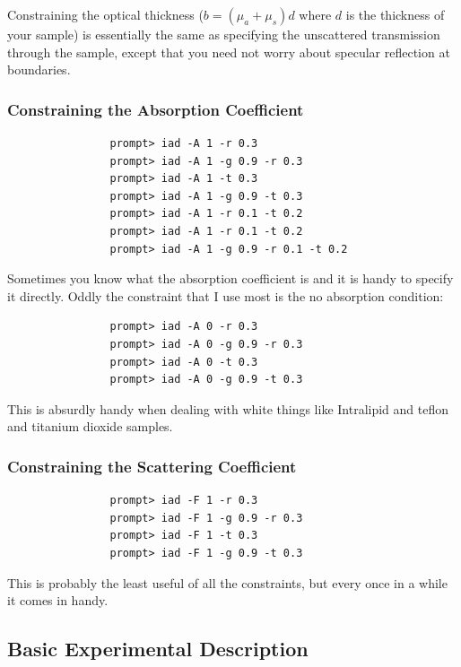 \documentclass{article}
\begin{document}
Constraining the optical thickness ($b=(\mu_a+\mu_s)d$ where $d$ is the 
thickness of your sample) is essentially the same as specifying
the unscattered transmission through the sample, except that you need not
worry about specular reflection at boundaries.

\subsubsection{Constraining the Absorption Coefficient}

\begin{verbatim}
                prompt> iad -A 1 -r 0.3
                prompt> iad -A 1 -g 0.9 -r 0.3
                prompt> iad -A 1 -t 0.3
                prompt> iad -A 1 -g 0.9 -t 0.3
                prompt> iad -A 1 -r 0.1 -t 0.2
                prompt> iad -A 1 -r 0.1 -t 0.2 
                prompt> iad -A 1 -g 0.9 -r 0.1 -t 0.2 
 \end{verbatim}

Sometimes you know what the absorption coefficient is and it is
handy to specify it directly.  Oddly the constraint that I use most
is the no absorption condition:
\begin{verbatim}
                prompt> iad -A 0 -r 0.3
                prompt> iad -A 0 -g 0.9 -r 0.3
                prompt> iad -A 0 -t 0.3
                prompt> iad -A 0 -g 0.9 -t 0.3
 \end{verbatim}
This is absurdly handy when dealing with white things like Intralipid
and teflon and titanium dioxide samples.

\subsubsection{Constraining the Scattering Coefficient}
\begin{verbatim}
                prompt> iad -F 1 -r 0.3
                prompt> iad -F 1 -g 0.9 -r 0.3
                prompt> iad -F 1 -t 0.3
                prompt> iad -F 1 -g 0.9 -t 0.3
\end{verbatim}
This is probably the least useful of all the constraints, but every once
in a while it comes in handy.  


\subsection{Basic Experimental Description}
\end{document}
